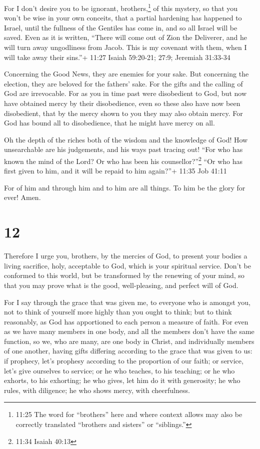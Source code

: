  For I don't desire you to be ignorant,
brothers,\footnote{11:25 The word for ``brothers'' here and where
  context allows may also be correctly translated ``brothers and
  sisters'' or ``siblings.''} of this mystery, so that you won't be wise
in your own conceits, that a partial hardening has happened to Israel,
until the fullness of the Gentiles has come in,  and so all
Israel will be saved. Even as it is written, ``There will come out of
Zion the Deliverer, and he will turn away ungodliness from Jacob.
 This is my covenant with them, when I will take away their
sins.''+ 11:27 Isaiah 59:20-21; 27:9; Jeremiah 31:33-34

 Concerning the Good News, they are enemies for your sake.
But concerning the election, they are beloved for the fathers' sake.
 For the gifts and the calling of God are irrevocable.
 For as you in time past were disobedient to God, but now
have obtained mercy by their disobedience,  even so these
also have now been disobedient, that by the mercy shown to you they may
also obtain mercy.  For God has bound all to disobedience,
that he might have mercy on all.

 Oh the depth of the riches both of the wisdom and the
knowledge of God! How unsearchable are his judgements, and his ways past
tracing out!  ``For who has known the mind of the Lord? Or
who has been his counsellor?''\footnote{11:34 Isaiah 40:13}
 ``Or who has first given to him, and it will be repaid to
him again?''+ 11:35 Job 41:11

 For of him and through him and to him are all things. To
him be the glory for ever! Amen.

\hypertarget{section-11}{%
\section{12}\label{section-11}}

 Therefore I urge you, brothers, by the mercies of God, to
present your bodies a living sacrifice, holy, acceptable to God, which
is your spiritual service.  Don't be conformed to this
world, but be transformed by the renewing of your mind, so that you may
prove what is the good, well-pleasing, and perfect will of God.

 For I say through the grace that was given me, to everyone
who is amongst you, not to think of yourself more highly than you ought
to think; but to think reasonably, as God has apportioned to each person
a measure of faith.  For even as we have many members in one
body, and all the members don't have the same function,  so
we, who are many, are one body in Christ, and individually members of
one another,  having gifts differing according to the grace
that was given to us: if prophecy, let's prophesy according to the
proportion of our faith;  or service, let's give ourselves
to service; or he who teaches, to his teaching;  or he who
exhorts, to his exhorting; he who gives, let him do it with generosity;
he who rules, with diligence; he who shows mercy, with cheerfulness.

